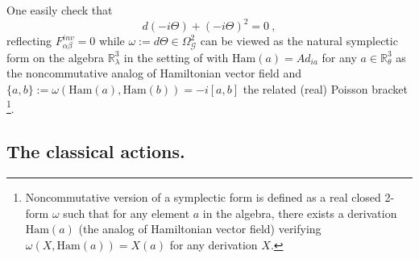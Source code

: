 \documentclass[a4paper,11pt,twoside]{article}
\numberwithin{equation}{section}
\newcommand\ham{{\text{Ham}}}
\theoremstyle{nonumberplain}
\newcounter{and}
\begin{document}
%
One easily check that%
%
\begin{equation*}
d(-i\Theta)+(-i\Theta)^2=0 \ ,
\end{equation*}
%
reflecting $F^{inv}_{\alpha\beta}=0$ while $\omega:=d\Theta\in\Omega^2_\mathcal{G}$ can be viewed as the natural symplectic form on the algebra $\mathbb{R}^3_\lambda$ in the setting of \cite{mdv88-99} with $\ham(a)=Ad_{ia}$ for any $a\in\mathbb{R}^3_\theta$ as the noncommutative analog of Hamiltonian vector field and $\{a,b\}:=\omega(\ham(a),\ham(b))=-i[a,b]$ the related (real) Poisson bracket {\footnote{Noncommutative version of a symplectic form is defined as a real closed 2-form $\omega$ such that for any element $a$ in the algebra, there exists a derivation $\ham(a)$ (the analog of Hamiltonian vector field) verifying $\omega(X,\ham(a))=X(a)$ for any derivation $X$.}}.\par

\subsection{The classical actions.}
\end{document}
